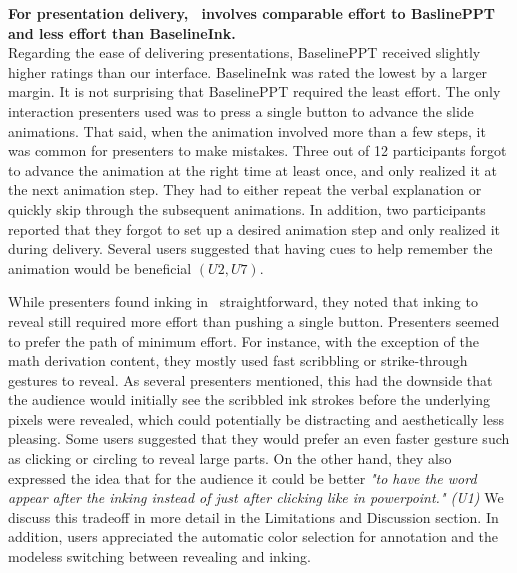\textbf{For presentation delivery, \interface\ involves comparable effort to BaslinePPT and less effort than BaselineInk.}\\
%
%
Regarding the ease of delivering presentations, BaselinePPT received slightly higher ratings than our interface. BaselineInk was rated the lowest by a larger margin. 
%
It is not surprising that BaselinePPT required the least effort. The only interaction presenters used was to press a single button to advance the slide animations. That said, when the animation involved more than a few steps, it was common for presenters to make mistakes. Three out of 12 participants forgot to advance the animation at the right time at least once, and only realized it at the next animation step. They had to either repeat the verbal explanation or quickly skip through the subsequent animations. In addition, two participants reported that they forgot to set up a desired animation step and only realized it during delivery. Several users suggested that having cues to help remember the animation would be beneficial $(U2, U7)$.

While presenters found inking in \interface\ straightforward, they noted that inking to reveal still required more effort than pushing a single button. Presenters seemed to prefer the path of minimum effort. For instance, with the exception of the math derivation content, they mostly used fast scribbling or strike-through gestures to reveal. As several presenters mentioned, this had the downside that the audience would initially see the scribbled ink strokes before the underlying pixels were revealed, which could potentially be distracting and aesthetically less pleasing. Some users suggested that they would prefer an even faster gesture such as clicking or circling to reveal large parts. On the other hand, they also expressed the idea that for the audience it could be better \textit{"to have the word appear after the inking instead of just after clicking like in powerpoint." (U1)} We discuss this tradeoff in more detail in the Limitations and Discussion section. %
%
In addition, users appreciated the automatic color selection for annotation and the modeless switching between revealing and inking. %

